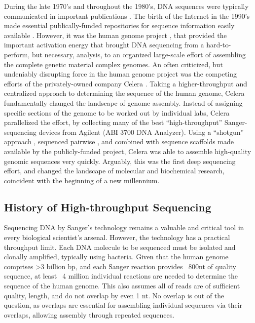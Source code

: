 During the late 1970’s and throughout the 1980’s, DNA sequences were typically communicated in important publications \citep{Cordell1980a,Sanger1978a}. The birth of the Internet in the 1990’s made essential publically-funded repositories for sequence information easily available \citep{Benson2011a}. However, it was the human genome project \citep{Lander2011a,Venter2001}, that provided the important activation energy that brought DNA sequencing from a hard-to-perform, but necessary, analysis, to an organized large-scale effort of assembling the complete genetic material complex genomes. An often criticized, but undeniably disrupting force in the human genome project was the competing efforts of the privately-owned company Celera \citep{Venter2008a}. Taking a higher-throughput and centralized approach to determining the sequence of the human genome, Celera fundamentally changed the landscape of genome assembly. Instead of assigning specific sections of the genome to be worked out by individual labs, Celera parallelized the effort, by collecting many of the best ``high-throughput'' Sanger-sequencing devices from Agilent (ABI 3700 DNA Analyzer). Using a ``shotgun'' approach \citep{Staden1979}, sequenced pairwise \citep{Roach1995}, and combined with sequence scaffolds made available by the publicly-funded project, Celera was able to assemble high-quality genomic sequences very quickly. Arguably, this was the first deep sequencing effort, and changed the landscape of molecular and biochemical research, coincident with the beginning of a new millennium.

\subsection{History of High-throughput Sequencing}

Sequencing DNA by Sanger’s technology remains a valuable and critical tool in every biological scientist’s arsenal. However, the technology has a practical throughput limit. Each DNA molecule to be sequenced must be isolated and clonally amplified, typically using bacteria. Given that the human genome \citep{Hattori2005a} comprises >3 billion bp, and each Sanger reaction provides ~800nt of quality sequence, at least ~4 million individual reactions are needed to determine the sequence of the human genome. This also assumes all of reads are of sufficient quality, length, and do not overlap by even 1 nt. No overlap is out of the question, as overlaps are essential for assembling individual sequences via their overlaps, allowing assembly through repeated sequences. 


